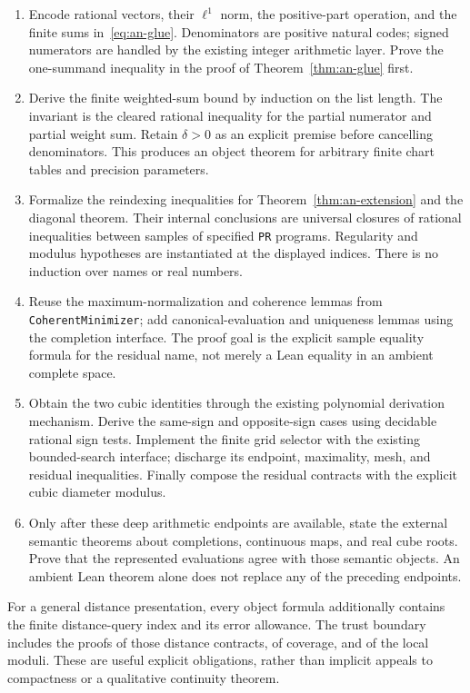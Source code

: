 \begin{enumerate}
\item Encode rational vectors, their $\ell^1$ norm, the positive-part
operation, and the finite sums in~\eqref{eq:an-glue}.  Denominators
are positive natural codes; signed numerators are handled by the
existing integer arithmetic layer.  Prove the one-summand inequality
in the proof of Theorem~\ref{thm:an-glue} first.

\item Derive the finite weighted-sum bound by induction on the list
length.  The invariant is the cleared rational inequality for the
partial numerator and partial weight sum.  Retain $\delta>0$ as an
explicit premise before cancelling denominators.  This produces an
object theorem for arbitrary finite chart tables and precision
parameters.

\item Formalize the reindexing inequalities for
Theorem~\ref{thm:an-extension} and the diagonal theorem.  Their
internal conclusions are universal closures of rational inequalities
between samples of specified \texttt{PR} programs.  Regularity and
modulus hypotheses are instantiated at the displayed indices.
There is no induction over names or real numbers.

\item Reuse the maximum-normalization and coherence lemmas from
\texttt{CoherentMinimizer}; add canonical-evaluation and uniqueness
lemmas using the completion interface.  The proof goal is the
explicit sample equality formula for the residual name, not merely a
Lean equality in an ambient complete space.

\item Obtain the two cubic identities through the existing polynomial
derivation mechanism.  Derive the same-sign and opposite-sign cases
using decidable rational sign tests.  Implement the finite grid
selector with the existing bounded-search interface; discharge its
endpoint, maximality, mesh, and residual inequalities.  Finally
compose the residual contracts with the explicit cubic diameter
modulus.

\item Only after these deep arithmetic endpoints are available,
state the external semantic theorems about completions, continuous
maps, and real cube roots.  Prove that the represented evaluations
agree with those semantic objects.  An ambient Lean theorem alone
does not replace any of the preceding endpoints.
\end{enumerate}

For a general distance presentation, every object formula additionally
contains the finite distance-query index and its error allowance.
The trust boundary includes the proofs of those distance contracts,
of coverage, and of the local moduli.  These are useful explicit
obligations, rather than implicit appeals to compactness or a
qualitative continuity theorem.

